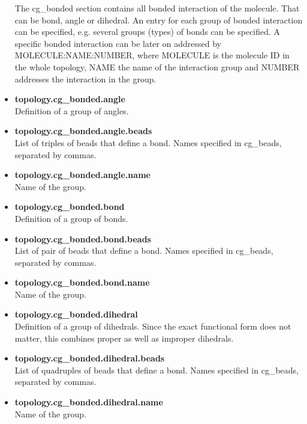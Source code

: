\begin{itemize}
      The cg\_bonded section contains all bonded interaction of the molecule. That can be bond, angle or dihedral.
      An entry for each group of bonded interaction can be specified, e.g. several groups (types) of bonds can be specified.
      A specific bonded interaction can be later on addressed by MOLECULE:NAME:NUMBER, where MOLECULE is the molecule ID in
      the whole topology, NAME the name of the interaction group and NUMBER addresses the interaction in the group.
\item \textbf{topology.cg\_bonded.angle} \\
      Definition of a group of angles.
\item \textbf{topology.cg\_bonded.angle.beads} \\
      List of triples of beads that define a bond. Names specified in cg\_beads, separated by commas.
\item \textbf{topology.cg\_bonded.angle.name} \\
      Name of the group.
\item \textbf{topology.cg\_bonded.bond} \\
      Definition of a group of bonds.
\item \textbf{topology.cg\_bonded.bond.beads} \\
      List of pair of beads that define a bond. Names specified in cg\_beads, separated by commas.
\item \textbf{topology.cg\_bonded.bond.name} \\
      Name of the group.
\item \textbf{topology.cg\_bonded.dihedral} \\
      Definition of a group of dihedrals. Since the exact functional form does not matter, this combines proper as well as improper dihedrals.
\item \textbf{topology.cg\_bonded.dihedral.beads} \\
      List of quadruples of beads that define a bond. Names specified in cg\_beads, separated by commas.
\item \textbf{topology.cg\_bonded.dihedral.name} \\
      Name of the group.
\end{itemize}
